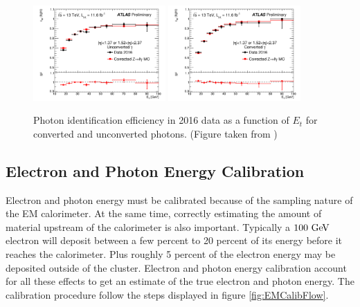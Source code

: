 \begin{figure}[!hp] 
\begin{center}
\includegraphics[width=0.45\textwidth]{figures/EMCalib/Unconverted_Et.png}
\includegraphics[width=0.45\textwidth]{figures/EMCalib/Converted_Et.png}
\caption{Photon identification efficiency in 2016 data as a function of $E_t$ for converted and unconverted photons. (Figure taken from \cite{EMReco13TeV}) }
\label{fig:elec_eff}
\end{center}
\end{figure}


\subsection{Electron and Photon Energy Calibration}
\label{sec:reco:EMCalibration}

\indent Electron and photon energy must be calibrated because of the sampling nature of the EM calorimeter.  At the same time, correctly estimating the amount of material upstream of the calorimeter is also important.  Typically a $100 \gev$ electron will deposit between a few percent to 20 percent of its energy before it reaches the calorimeter.\cite{EMReco13TeV}  Plus roughly 5 percent of the electron energy may be deposited outside of the cluster.  Electron and photon energy calibration account for all these effects to get an estimate of the true electron and photon energy.  The calibration procedure follow the steps displayed in figure \ref{fig:EMCalibFlow}. \\

